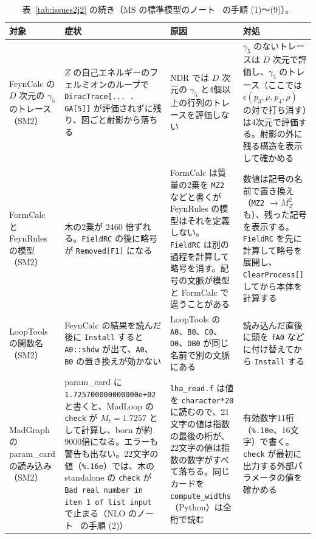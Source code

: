 \documentclass[a4paper,10pt]{ltjsarticle}
\begin{document}
\begin{table}[tbp]
\centering\footnotesize
\caption{表~\ref{tab:issues2j2} の続き（$\overline{\mathrm{MS}}$ の標準模型のノート~\cite{smmsbarnote} の手順 (1)〜(9)）。}
\label{tab:issues2j3}
\begin{tabularx}{\linewidth}{>{\raggedright\arraybackslash}p{2.4cm}>{\raggedright\arraybackslash}X>{\raggedright\arraybackslash}X>{\raggedright\arraybackslash}X}
\toprule
\textbf{対象} & \textbf{症状} & \textbf{原因} & \textbf{対処} \\
\midrule
FeynCalc の $D$ 次元の $\gamma_5$ のトレース（SM2） & $Z$ の自己エネルギーのフェルミオンのループで \texttt{DiracTrace[...\,.\,GA[5]]} が評価されずに残り、図ごと射影から落ちる & NDR では $D$ 次元の $\gamma_5$ と4個以上の行列のトレースを評価しない & $\gamma_5$ のないトレースは $D$ 次元で評価し、$\gamma_5$ のトレース（ここでは $\epsilon(p_3,\mu,p_4,\rho)$ の対で打ち消す）は4次元で評価する。射影の外に残る構造を表示して確かめる \\
FormCalc と FeynRules の模型（SM2） & 木の2乗が 2460 倍ずれる。\texttt{FieldRC} の後に略号が \texttt{Removed[F1]} になる & FormCalc は質量の2乗を \texttt{MZ2} などと書くが FeynRules の模型はそれを定義しない。\texttt{FieldRC} は別の過程を計算して略号を消す。記号の文脈が模型と FormCalc で違うことがある & 数値は記号の名前で置き換え（\texttt{MZ2} $\to M_Z^2$ も）、残った記号を表示する。\texttt{FieldRC} を先に計算して略号を展開し、\texttt{ClearProcess[]} してから本体を計算する \\
LoopTools の関数名（SM2） & FeynCalc の結果を読んだ後に \texttt{Install} すると \texttt{A0::shdw} が出て、\texttt{A0}、\texttt{B0} の置き換えが効かない & LoopTools の \texttt{A0}、\texttt{B0}、\texttt{C0}、\texttt{D0}、\texttt{DB0} が同じ名前で別の文脈にある & 読み込んだ直後に頭を \texttt{fA0} などに付け替えてから \texttt{Install} する \\
MadGraph の param\_card の読み込み（SM2） & param\_card に \texttt{1.7257000000}\allowbreak\texttt{00000e+02} と書くと、MadLoop の \texttt{check} が $M_t=1.7257$ として計算し、born が約9000倍になる。エラーも警告も出ない。22文字の値（\texttt{\%.16e}）では、木の standalone の \texttt{check} が \texttt{Bad real number in item 1 of list input} で止まる（NLO のノート~\cite{smnlonote} の手順 (2)） & \texttt{lha\_read.f} は値を \texttt{character*20} に読むので、21文字の値は指数の最後の桁が、22文字の値は指数の数字がすべて落ちる。同じカードを \texttt{compute\_widths}（Python）は全桁で読む & 有効数字11桁（\texttt{\%.10e}、16文字）で書く。\texttt{check} が最初に出力する外部パラメータの値を確かめる \\

\end{tabularx}
\end{table}
\end{document}
